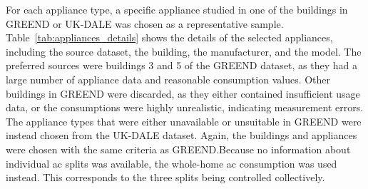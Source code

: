 For each appliance type, a specific appliance studied in one of the buildings in GREEND or UK-DALE was chosen as a representative sample. Table~\ref{tab:appliances_details} shows the details of the selected appliances, including the source dataset, the building, the manufacturer, and the model. The preferred sources were buildings 3 and 5 of the GREEND dataset, as they had a large number of appliance data and reasonable consumption values. Other buildings in GREEND were discarded, as they either contained insufficient usage data, or the consumptions were highly unrealistic, indicating measurement errors. The appliance types that were either unavailable or unsuitable in GREEND were instead chosen from the UK-DALE dataset. Again, the buildings and appliances were chosen with the same criteria as GREEND.\@ Because no information about individual \acrshort{ac} splits was available, the whole-home \acrshort{ac} consumption was used instead. This corresponds to the three splits being controlled collectively.

\begin{table}
  \centering
  \caption[Details of selected appliances]{Details of selected appliances. Empty cells indicate that the information is not provided}%
  \label{tab:appliances_details}
\end{table}

